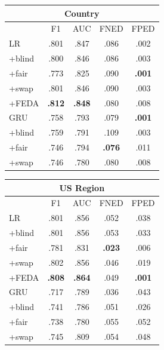 \begin{table}[t!]
\begin{tabular}{l||cc|cc}
\multicolumn{5}{c}{\bf Country} \\\hline
&F1&AUC&FNED&FPED\\\hline\hline
LR& .801 & .847 & .086 & .002\\
+blind& .800 & .846 & .086 & .003\\
+fair& .773 & .825 & .090 & \bf .001\\
+swap& .801 & .846 & .090 & .003\\
+FEDA& \bf .812 & \bf .848 & .080 & .008\\
\hline
GRU & .758 & .793 & .079 & \bf .001 \\
+blind& .759 & .791 & .109 & .003\\
+fair& .746 & .794 & \bf .076 & .011\\
+swap& .746 & .780 & .080 & .008 \\\hline
\end{tabular}
\quad
\begin{tabular}{l||cc|cc}
\multicolumn{5}{c}{\bf US Region} \\\hline
&F1&AUC&FNED&FPED\\\hline\hline
LR& .801 & .856 & .052 & .038 \\
+blind& .801 & .856 & .053 & .033\\
+fair& .781 & .831 & \bf .023 & .006\\
+swap& .802 & .856 & .046 & .019\\
+FEDA& \bf .808 & \bf .864 & .049 & \bf .001\\\hline
GRU& .717 & .789 & .036 & .043\\
+blind& .741 & .786 & .051 & .026\\
+fair& .738 & .780 & .055 & .052\\
+swap& .745 & .809 & .054 & .048 \\\hline
\end{tabular}


\end{table}
